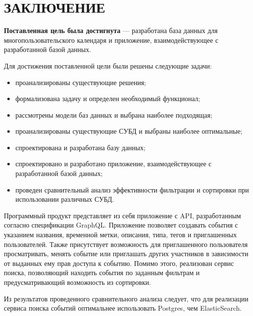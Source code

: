 \section*{ЗАКЛЮЧЕНИЕ}

\textbf{Поставленная цель была достигнута} --- разработана база данных для многопользовательского календаря и приложение, взаимодействующее с разработанной базой данных.

Для достижения поставленной цели были решены следующие задачи:
\begin{itemize}[label=---]
	\item проанализированы существующие решения;
	\item формализована задачу и определен необходимый функционал; 
	\item рассмотрены модели баз данных и выбрана наиболее подходящая; 
	\item проанализированы существующие СУБД и выбраны наиболее оптимальные; 
	\item спроектирована и разработана базу данных;
	\item спроектировано и разработано приложение, взаимодействующее с разработанной базой данных;
	\item проведен сравнительный анализ эффективности фильтрации и сортировки при использовании различных СУБД.
\end{itemize}

Программный продукт представляет из себя приложение с API, разработанным согласно спецификации GraphQL. Приложение позволяет создавать события с указанием названия, временной метки, описания, типа,  тегов и приглашенных пользователей. Также присутствует возможность для приглашенного пользователя просматривать, менять событие или приглашать других участников в зависимости от выданных ему прав доступа к событию. Помимо этого, реализован сервис поиска, позволяющий находить события по заданным фильтрам и предусматривающий возможность из сортировки.


Из результатов проведенного сравнительного анализа следует, что для реализации сервиса поиска событий оптимальнее использовать Postgres, чем \linebreak ElasticSearch. 


